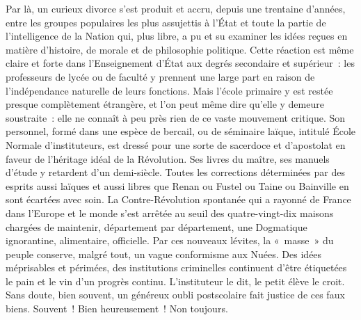 \documentclass[french,twoside]{book} %
\begin{document}
Par là, un curieux divorce s’est produit et accru, depuis une trentaine d’années, entre les groupes populaires les plus assujettis à l’État et toute la partie de l’intelligence de la Nation qui, plus libre, a pu et su examiner les idées reçues en matière d’histoire, de morale et de philosophie politique. Cette réaction est même claire et forte dans l’Enseignement d’État aux degrés secondaire et supérieur : les professeurs de lycée ou de faculté y prennent une large part en raison de l’indépendance naturelle de leurs fonctions. Mais l’école primaire y est restée presque complètement étrangère, et l’on peut même dire qu’elle y demeure soustraite : elle ne connaît à peu près rien de ce vaste mouvement critique. Son personnel, formé dans une espèce de bercail, ou de séminaire laïque, intitulé École Normale d’instituteurs, est dressé pour une sorte de sacerdoce et d’apostolat en faveur de l’héritage idéal de la Révolution. Ses livres du maître, ses manuels d’étude y retardent d’un demi-siècle. Toutes les corrections déterminées par des esprits aussi laïques et aussi libres que Renan ou Fustel ou Taine ou Bainville en sont écartées avec soin. La Contre-Révolution spontanée qui a rayonné de France dans l’Europe et le monde s’est arrêtée au seuil des quatre-vingt-dix maisons chargées de maintenir, département par département, une Dogmatique ignorantine, alimentaire, officielle. Par ces nouveaux lévites, la « masse » du peuple conserve, malgré tout, un vague conformisme aux Nuées. Des idées méprisables et périmées, des institutions criminelles continuent d’être étiquetées le pain et le vin d’un progrès continu. L’instituteur le dit, le petit élève le croit. Sans doute, bien souvent, un généreux oubli postscolaire fait justice de ces faux biens. Souvent ! Bien heureusement ! Non toujours.\par
\end{document}
